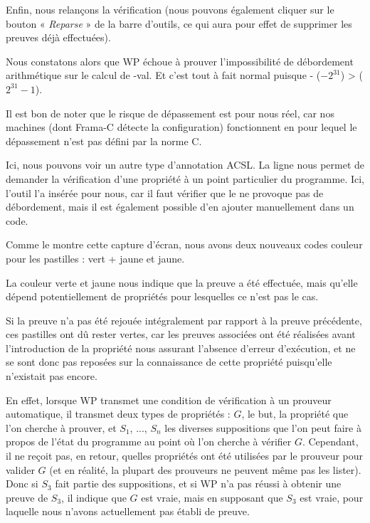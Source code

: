 Enfin, nous relançons la vérification (nous pouvons également cliquer sur le
bouton « \textit{Reparse} » de la barre d'outils, ce qui aura pour effet de
supprimer les preuves déjà effectuées).



Nous constatons alors que WP échoue à prouver  l'impossibilité de
débordement arithmétique sur le calcul de -val. Et c'est tout à fait normal
puisque - ($-2^{31}$) >  ($2^{31}-1$).





\begin{Information}
Il est bon de noter que le risque de dépassement est pour nous réel, car nos
machines (dont Frama-C détecte la configuration) fonctionnent en
pour lequel le dépassement n'est pas défini par la norme C.
\end{Information}


Ici, nous pouvons voir un autre type d'annotation ACSL. La
ligne  nous permet de demander la vérification
d'une propriété à un point particulier du programme. Ici, l'outil l'a
insérée pour nous, car il faut vérifier que le  ne provoque pas de
débordement, mais il est également possible d'en ajouter manuellement dans
un code.



Comme le montre cette capture d'écran, nous avons deux nouveaux codes couleur
pour les pastilles : vert + jaune et jaune.



La couleur verte et jaune nous indique que la preuve a été effectuée, mais
qu'elle dépend potentiellement de propriétés pour lesquelles ce n'est pas le
cas.



Si la preuve n'a pas été rejouée intégralement par rapport à la preuve
précédente, ces pastilles ont dû rester vertes, car les preuves associées ont
été réalisées avant l'introduction de la propriété nous assurant l'absence
d'erreur d'exécution, et ne se sont donc pas reposées sur la connaissance de
cette propriété puisqu'elle n'existait pas encore.



En effet, lorsque WP transmet une condition de vérification à un prouveur
automatique, il transmet deux types de propriétés : $G$, le but, la propriété
que l'on cherche à prouver, et $S_1$, ..., $S_n$ les diverses suppositions que l'on
peut faire à propos de l'état du programme au point où l'on cherche à vérifier $G$.
Cependant, il ne reçoit pas, en retour, quelles propriétés ont été utilisées par
le prouveur pour valider $G$ (et en réalité, la plupart des prouveurs ne peuvent
même pas les lister). Donc si $S_3$ fait partie des suppositions, et si
WP n'a pas réussi à obtenir une preuve de $S_3$, il indique que $G$ est vraie, mais
en supposant que $S_3$ est vraie, pour laquelle nous n'avons actuellement pas
établi de preuve.



